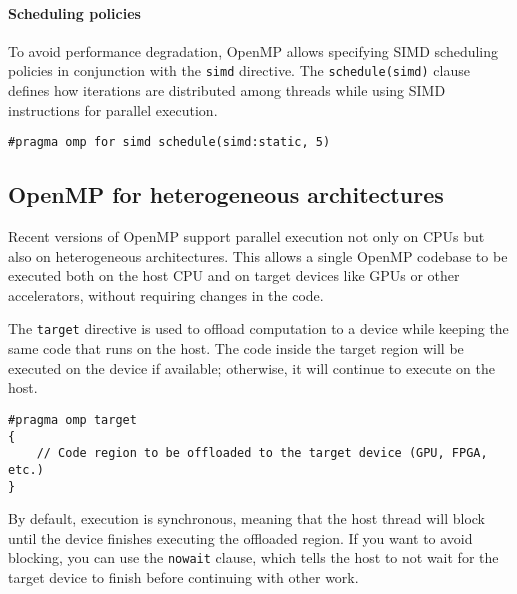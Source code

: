 \paragraph*{Scheduling policies}
To avoid performance degradation, OpenMP allows specifying SIMD scheduling policies in conjunction with the \texttt{simd} directive. 
The \texttt{schedule(simd)} clause defines how iterations are distributed among threads while using SIMD instructions for parallel execution.
\begin{lstlisting}[style=C]
#pragma omp for simd schedule(simd:static, 5) 
\end{lstlisting}

\subsection{OpenMP for heterogeneous architectures}
Recent versions of OpenMP support parallel execution not only on CPUs but also on heterogeneous architectures. 
This allows a single OpenMP codebase to be executed both on the host CPU and on target devices like GPUs or other accelerators, without requiring changes in the code.

The \texttt{target} directive is used to offload computation to a device while keeping the same code that runs on the host. 
The code inside the target region will be executed on the device if available; otherwise, it will continue to execute on the host.
\begin{lstlisting}[style=C]
#pragma omp target
{
    // Code region to be offloaded to the target device (GPU, FPGA, etc.)
}
\end{lstlisting}
By default, execution is synchronous, meaning that the host thread will block until the device finishes executing the offloaded region.
If you want to avoid blocking, you can use the \texttt{nowait} clause, which tells the host to not wait for the target device to finish before continuing with other work.

